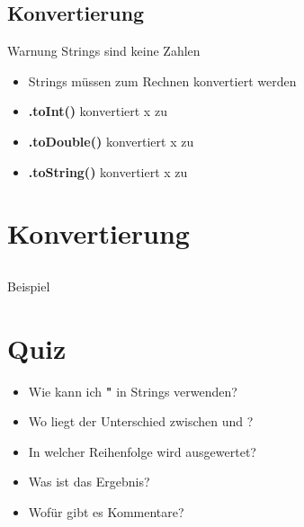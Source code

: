 \subsection{Konvertierung}
\begin{frame}
    \slidehead
    \begin{block}{Warnung}
        Strings sind keine Zahlen
    \end{block}


    \pause

    \begin{itemize}[<+->]
        \item Strings müssen zum Rechnen konvertiert werden
        \item \textbf{.toInt()} konvertiert x zu 
        \item \textbf{.toDouble()} konvertiert x zu 
        \item \textbf{.toString()} konvertiert x zu 
    \end{itemize}

\end{frame}

\section{Konvertierung}
\subsection{}
\begin{frame}
    \slidehead
    \begin{block}{Beispiel}
    \end{block}
\end{frame}

\livecoding

\section{Quiz}
\begin{frame}
    \slidehead
    \begin{itemize}[<+->]
        \item Wie kann ich \textbf{"} in Strings verwenden?
        \item Wo liegt der Unterschied zwischen  und ?
        \item In welcher Reihenfolge wird  ausgewertet?
        \item Was ist das Ergebnis?
        \item Wofür gibt es Kommentare?
    \end{itemize}
\end{frame}



